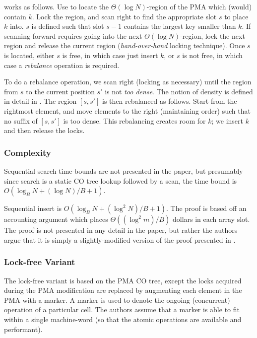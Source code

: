 \documentclass[preprint]{style}
\begin{document}
\Insert{} works as follows. Use \Search{} to locate the $\Theta(\log
N)$-region of the PMA which (would) contain $k$. Lock the region, and scan
right to find the appropriate slot $s$ to place $k$ into. $s$ is defined such
that slot $s - 1$ contains the largest key smaller than $k$. If scanning
forward requires going into the next $\Theta(\log N)$-region, lock the next
region and release the current region (\textit{hand-over-hand} locking
technique). Once $s$ is located, either $s$ is free, in which case just insert
$k$, or $s$ is not free, in which case a \textit{rebalance} operation is
required.

To do a rebalance operation, we scan right (locking as necessary) until the
region from $s$ to the current position $s'$ is not \textit{too dense}. The
notion of density is defined in detail in \cite{BenderFiGi05}. The region $[s,
s']$ is then rebalanced as follows. Start from the rightmost element, and move
elements to the right (maintaining order) such that no suffix of $[s, s']$ is
too dense. This rebalancing creates room for $k$; we insert $k$ and then
release the locks.



\subsubsection{Complexity}


Sequential search time-bounds are not presented in the paper, but presumably
since search is a static CO tree lookup followed by a scan, the time bound is
$O(\log_{B}{N} + ({\log{N}})/{B} + 1)$.


Sequential insert is $O(\log_{B}{N} + (\log^2{N})/{B} + 1)$. The proof is based
off an accounting argument which places $\Theta((\log^2{m})/B)$ dollars in each
array slot. The proof is not presented in any detail in the paper, but rather
the authors argue that it is simply a slightly-modified version of the proof
presented in \cite{Katriel02}.



\subsubsection{Lock-free Variant}

The lock-free variant is based on the PMA CO tree, except the locks acquired
during the PMA modification are replaced by augmenting each element in the PMA
with a marker. A marker is used to denote the ongoing (concurrent) operation of
a particular cell. The authors assume that a marker is able to fit within a
single machine-word (so that the atomic operations are available and
performant).
\end{document}
